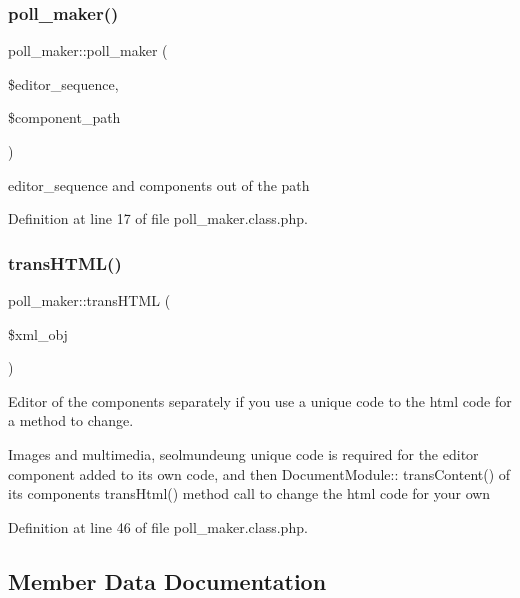 \hypertarget{classpoll__maker_ae8956a214b15ddd49a3e7538a15791ba}{}\label{classpoll__maker_ae8956a214b15ddd49a3e7538a15791ba} 
\subsubsection{\texorpdfstring{poll\+\_\+maker()}{poll\_maker()}}
{\footnotesize\ttfamily poll\+\_\+maker\+::poll\+\_\+maker (\begin{DoxyParamCaption}\item[{}]{\$editor\+\_\+sequence,  }\item[{}]{\$component\+\_\+path }\end{DoxyParamCaption})}



editor\+\_\+sequence and components out of the path 



Definition at line 17 of file poll\+\_\+maker.\+class.\+php.

\hypertarget{classpoll__maker_ac8d4b0f45f16016ad7f711123cc98ea8}{}\label{classpoll__maker_ac8d4b0f45f16016ad7f711123cc98ea8} 
\subsubsection{\texorpdfstring{trans\+H\+T\+M\+L()}{transHTML()}}
{\footnotesize\ttfamily poll\+\_\+maker\+::trans\+H\+T\+ML (\begin{DoxyParamCaption}\item[{}]{\$xml\+\_\+obj }\end{DoxyParamCaption})}



Editor of the components separately if you use a unique code to the html code for a method to change. 

Images and multimedia, seolmundeung unique code is required for the editor component added to its own code, and then Document\+Module\+:\+: trans\+Content() of its components trans\+Html() method call to change the html code for your own 

Definition at line 46 of file poll\+\_\+maker.\+class.\+php.



\subsection{Member Data Documentation}
\hypertarget{classpoll__maker_aed45da13a32668475091fceb3a3e526d}{}\label{classpoll__maker_aed45da13a32668475091fceb3a3e526d} 
